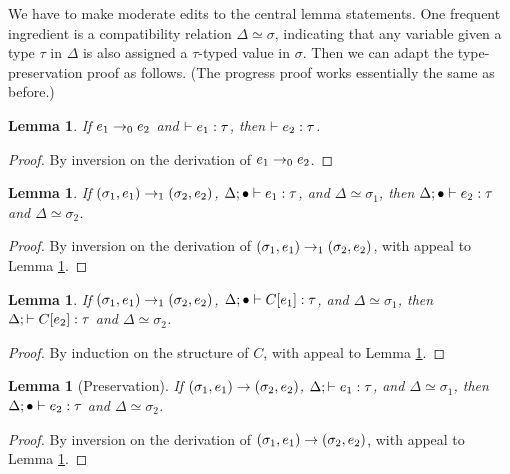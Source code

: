 \documentclass{amsbook}
\newtheorem{lemma}[theorem]{Lemma}
\theoremstyle{definition}
\theoremstyle{remark}
\numberwithin{section}{chapter}
\numberwithin{equation}{chapter}
\begin{document}
We have to make moderate edits to the central lemma statements.
One frequent ingredient is a compatibility relation $\Delta \simeq \sigma$, indicating that any variable given a type $\tau$ in $\Delta$ is also assigned a $\tau$-typed value in $\sigma$.
Then we can adapt the type-preservation proof as follows.
(The progress proof works essentially the same as before.)

\begin{lemma}\label{mutable_preservation0}
  If $e_1 \to_0 e_2$ and $\vdash e_1 : \tau$, then $\vdash e_2 : \tau$.
\end{lemma}
\begin{proof}
  By inversion on the derivation of $e_1 \to_0 e_2$.
\end{proof}

\begin{lemma}\label{preservation1}
  If $(\sigma_1, e_1) \to_1 (\sigma_2, e_2)$, $\Delta; \bullet \vdash e_1 : \tau$, and $\Delta \simeq \sigma_1$, then $\Delta; \bullet \vdash e_2 : \tau$ and $\Delta \simeq \sigma_2$.
\end{lemma}
\begin{proof}
  By inversion on the derivation of $(\sigma_1, e_1) \to_1 (\sigma_2, e_2)$, with appeal to Lemma \ref{mutable_preservation0}.
\end{proof}

\begin{lemma}\label{mutable_preservation_prime}
  If $(\sigma_1, e_1) \to_1 (\sigma_2, e_2)$, $\Delta; \bullet \vdash C[e_1] : \tau$, and $\Delta \simeq \sigma_1$, then $\Delta;  \vdash C[e_2] : \tau$ and $\Delta \simeq \sigma_2$.
\end{lemma}
\begin{proof}
  By induction on the structure of $C$, with appeal to Lemma \ref{preservation1}.
\end{proof}

\begin{lemma}[Preservation]\label{mutable_preservation}
  If $(\sigma_1, e_1) \to (\sigma_2, e_2)$, $\Delta;  \vdash e_1 : \tau$, and $\Delta \simeq \sigma_1$, then $\Delta; \bullet \vdash e_2 : \tau$ and $\Delta \simeq \sigma_2$.
\end{lemma}
\begin{proof}
  By inversion on the derivation of $(\sigma_1, e_1) \to (\sigma_2, e_2)$, with appeal to Lemma \ref{mutable_preservation_prime}.
\end{proof}
\end{document}

